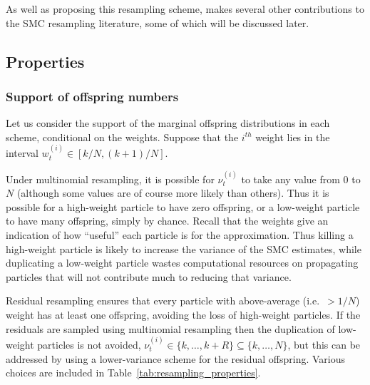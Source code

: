 As well as proposing this resampling scheme, \textcite{gerber2017} makes several other contributions to the SMC resampling literature, some of which will be discussed later.






\subsection{Properties \seb{$\sim$} }\label{sec:resampling_properties}



\subsubsection{Support of offspring numbers \seb{$\checkmark$} }
Let us consider the support of the marginal offspring distributions in each scheme, conditional on the weights. Suppose that the $i^{th}$ weight lies in the interval $w_t^{(i)} \in [k/N, (k+1)/N]$.

Under multinomial resampling, it is possible for $\nu_t^{(i)}$ to take any value from $0$ to $N$ (although some values are of course more likely than others).
Thus it is possible for a high-weight particle to have zero offspring, or a low-weight particle to have many offspring, simply by chance.
Recall that the weights give an indication of how ``useful'' each particle is for the approximation. Thus killing a high-weight particle is likely to increase the variance of the SMC estimates, while duplicating a low-weight particle wastes computational resources on propagating particles that will not contribute much to reducing that variance.

Residual resampling ensures that every particle with above-average (i.e.\ $>1/N$) weight has at least one offspring, avoiding the loss of high-weight particles. If the residuals are sampled using multinomial resampling then the duplication of low-weight particles is not avoided, $\nu_t^{(i)} \in \{k, \dots, k+R\} \subseteq \{k,\dots, N\}$, but this can be addressed by using a lower-variance scheme for the residual offspring. Various choices are included in Table~\ref{tab:resampling_properties}.


